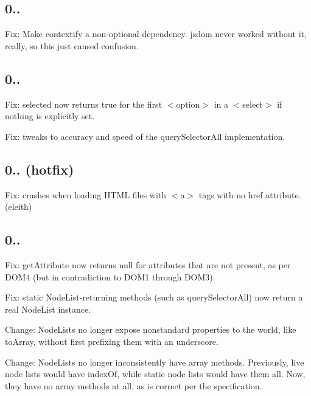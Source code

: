 \subsection*{0..}


\begin{DoxyItemize}
\item Fix\+: Make {\ttfamily contextify} a non-\/optional dependency. jsdom never worked without it, really, so this just caused confusion.
\end{DoxyItemize}

\subsection*{0..}


\begin{DoxyItemize}
\item Fix\+: {\ttfamily selected} now returns true for the first {\ttfamily $<$option$>$} in a {\ttfamily $<$select$>$} if nothing is explicitly set.
\item Fix\+: tweaks to accuracy and speed of the {\ttfamily query\+Selector\+All} implementation.
\end{DoxyItemize}

\subsection*{0.. (hotfix)}


\begin{DoxyItemize}
\item Fix\+: crashes when loading H\+T\+ML files with {\ttfamily $<$a$>$} tags with no {\ttfamily href} attribute. (eleith)
\end{DoxyItemize}

\subsection*{0..}


\begin{DoxyItemize}
\item Fix\+: {\ttfamily get\+Attribute} now returns {\ttfamily null} for attributes that are not present, as per D\+O\+M4 (but in contradiction to D\+O\+M1 through D\+O\+M3).
\item Fix\+: static {\ttfamily Node\+List}-\/returning methods (such as {\ttfamily query\+Selector\+All}) now return a real {\ttfamily Node\+List} instance.
\item Change\+: {\ttfamily Node\+List}s no longer expose nonstandard properties to the world, like {\ttfamily to\+Array}, without first prefixing them with an underscore.
\item Change\+: {\ttfamily Node\+List}s no longer inconsistently have array methods. Previously, live node lists would have {\ttfamily index\+Of}, while static node lists would have them all. Now, they have no array methods at all, as is correct per the specification.
\end{DoxyItemize}

